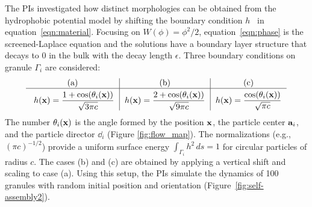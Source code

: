 The PIs investigated how distinct morphologies can be obtained from the
hydrophobic potential model by shifting the boundary condition
$h$~\cite{fu-ryh-qua-you2022} in equation~\eqref{eqn:material}. Focusing
on $W(\phi) = \phi^2/2$, equation~\eqref{eqn:phase} is the
screened-Laplace equation and the solutions have a boundary layer
structure that decays to $0$ in the bulk with the decay length
$\epsilon$. Three boundary conditions on granule $\Gamma_i$ are
considered:
\begin{equation}
  \label{eq:bcs}
  \begin{tabular}{c|c|c}
     \text{(a)} & \text{(b)} & \text{(c)} \\
    \hline
    \rule{0pt}{4ex} 
      $h(\mathbf{x}) = \displaystyle \frac{1+\cos (\theta_i(\xx))}{\sqrt{3\pi c}}$
    & $h(\mathbf{x}) = \displaystyle \frac{2+\cos (\theta_i(\xx))}{\sqrt{9\pi c}}$
    & $h(\mathbf{x}) = \displaystyle \frac{\cos (\theta_i(\xx))}{\sqrt{\pi c}}$
\end{tabular}
\end{equation}
The number $\theta_i(\xx)$ is the angle formed by the position $\xx$,
the particle center $\aa_i$, and the particle director $\dd_i$ (Figure
\ref{fig:flow_map}). The normalizations (e.g., $(\pi c)^{-1/2}$) provide
a uniform surface energy $\int_{\Gamma_i} h^2 \,ds = 1$ for circular
particles of radius $c$. The cases (b) and (c) are obtained by applying
a vertical shift and scaling to case (a). Using this setup, the PIs
simulate the dynamics of 100 granules with random initial position and
orientation (Figure~\ref{fig:self-assembly2}).

